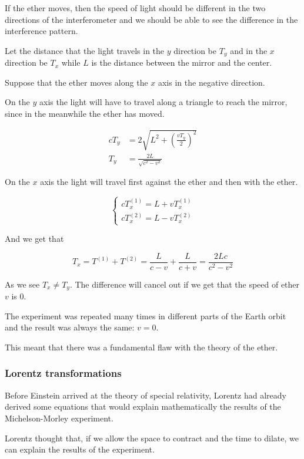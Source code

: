 \documentclass[10pt]{extarticle}
\begin{document}
If the ether moves, then the speed of light should be different in the two directions of the interferometer and we should be able to see the difference in the interference pattern.

Let the distance that the light travels in the $y$ direction be $T_y$ and in the $x$ direction be $T_x$ while $L$ is the distance between the mirror and the center.

Suppose that the ether moves along the $x$ axis in the negative direction.

On the $y$ axis the light will have to travel along a triangle to reach the mirror, since in the meanwhile the ether has moved.

\begin{align*}
    cT_y & = 2\sqrt{L^2 + \left(\frac{vT_y}{2}\right)^2} \\
    T_y  & = \frac{2L}{\sqrt{c^2 - v^2}}
\end{align*}

On the $x$ axis the light will travel first against the ether and then with the ether.

$$
    \begin{cases}
        cT_x^{(1)} = L + v T_x^{(1)} \\
        cT_x^{(2)} = L - v T_x^{(2)}
    \end{cases}
$$

And we get that

$$
    T_x = T^{(1)} + T^{(2)} = \frac{L}{c - v} + \frac{L}{c + v} = \frac{2Lc}{c^2 - v^2}
$$

As we see $T_x \neq T_y$. The difference will cancel out if we get that the speed of ether $v$ is 0.

The experiment was repeated many times in different parts of the Earth orbit and the result was always the same: $v = 0$.

This meant that there was a fundamental flaw with the theory of the ether.

\subsubsection{Lorentz transformations}

Before Einstein arrived at the theory of special relativity, Lorentz had already derived some equations that would explain mathematically the results of the Michelson-Morley experiment.

Lorentz thought that, if we allow the space to contract and the time to dilate, we can explain the results of the experiment.
\end{document}
